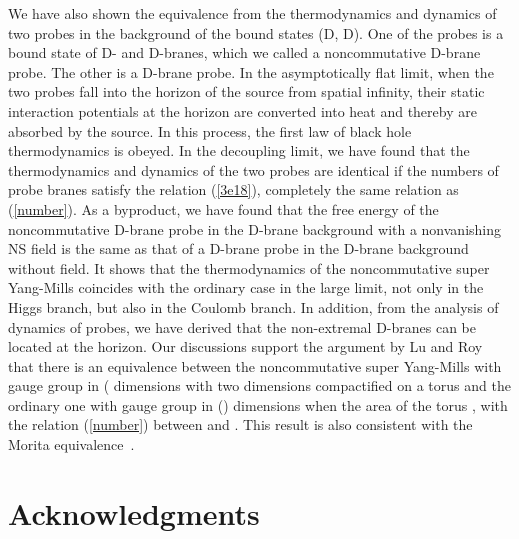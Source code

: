 \documentclass[a4paper,12pt]{article}
\begin{document}
We have also shown the equivalence from the thermodynamics and dynamics
of two probes in the background of the bound states (D\coordHE{}, D\coordHE{}). One
of the probes is a bound state of D\coordHE{}- and D\coordHE{}-branes, which we called
a noncommutative D\coordHE{}-brane probe. The other is a D\coordHE{}-brane probe.
In the asymptotically flat limit, when the two probes fall into the horizon
of the source from spatial infinity, their static interaction potentials
at the horizon  are converted into heat and thereby are absorbed by the
source. In this process, the first law of black hole thermodynamics is
obeyed. In the decoupling limit, we
have found that the thermodynamics and dynamics of the two probes are
identical if the numbers of probe branes satisfy the relation (\ref{3e18}),
completely the same relation as (\ref{number}). As a byproduct, we have
found that the free energy of the noncommutative D\coordHE{}-brane probe in the
D\coordHE{}-brane background with a nonvanishing NS \coordHE{} field is the same as that
of a D\coordHE{}-brane probe in the D\coordHE{}-brane background without \coordHE{} field. It shows
that the thermodynamics of the noncommutative super Yang-Mills coincides with
the ordinary case in the large \coordHE{} limit, not only in the Higgs branch, but
also in the Coulomb branch. In addition, from the analysis of dynamics of
probes, we have derived that the non-extremal D\coordHE{}-branes can be located at
the horizon. Our discussions support the argument by Lu and Roy \cite{Lu}
that there is  an equivalence between the noncommutative super
Yang-Mills with gauge group \coordHE{} in (\coordHE{} dimensions with two dimensions
compactified on a torus and the ordinary one with gauge group
\coordHE{} in (\coordHE{}) dimensions when the area of the torus \coordHE{}, with the relation (\ref{number}) between \coordHE{} and
\coordHE{}. This result is also consistent with the Morita
equivalence~\cite{Hashimoto2}.


\section*{Acknowledgments}
\end{document}
